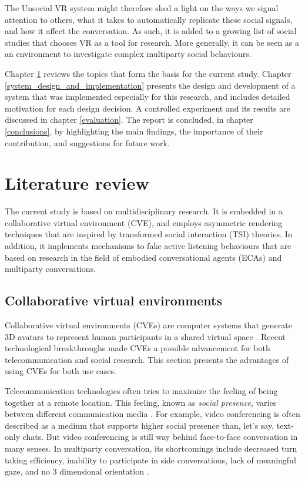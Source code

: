 \documentclass[]{simple-thesis}
\begin{document}
The Unsocial VR system might therefore shed a light on the ways we signal attention to others, what it takes to automatically replicate these social signals, and how it affect the conversation.
As such, it is added to a growing list of social studies that chooses VR as a tool for research.
More generally, it can be seen as a an environment to investigate complex multiparty social behaviours.

Chapter \ref{literature_review} reviews the topics that form the basis for the current study.
Chapter \ref{system_design_and_implementation} presents the design and development of a system that was implemented especially for this research, and includes detailed motivation for each design decision.
A controlled experiment and its results are discussed in chapter \ref{evaluation}.
The report is concluded, in chapter \ref{conclusions}, by highlighting the main findings, the importance of their contribution, and suggestions for future work.


\chapter{Literature review}\label{literature_review}

The current study is based on multidisciplinary research.
It is embedded in a collaborative virtual environment (CVE), and employs asymmetric rendering techniques that are inspired by transformed social interaction (TSI) theories.
In addition, it implements mechanisms to fake active listening behaviours that are based on research in the field of embodied conversational agents (ECAs) and multiparty conversations.

\section{Collaborative virtual environments}

Collaborative virtual environments (CVEs) are computer systems that generate 3D avatars to represent human participants in a shared virtual space \citep{Bailenson2004}.
Recent technological breakthroughs made CVEs a possible advancement for both telecommunication and social research.
This section presents the advantages of using CVEs for both use cases.

Telecommunication technologies often tries to maximize the feeling of being together at a remote location.
This feeling, known as \textit{social presence}, varies between different communication media \citep{Short1976}.
For example, video conferencing is often described as a medium that supports higher social presence than, let's say, text-only chats.
But video conferencing is still way behind face-to-face conversation in many senses.
In multiparty conversation, its shortcomings include decreased turn taking efficiency, inability to participate in side conversations, lack of meaningful gaze, and no 3 dimensional orientation \citep{Isaacs1994}.
\end{document}
